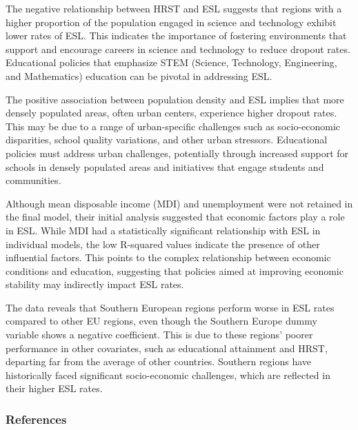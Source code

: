 \documentclass[
  letterpaper,
  DIV=11,
  numbers=noendperiod,
  abstract]{scrartcl}
\begin{document}
The negative relationship between HRST and ESL suggests that regions
with a higher proportion of the population engaged in science and
technology exhibit lower rates of ESL. This indicates the importance of
fostering environments that support and encourage careers in science and
technology to reduce dropout rates. Educational policies that emphasize
STEM (Science, Technology, Engineering, and Mathematics) education can
be pivotal in addressing ESL.

The positive association between population density and ESL implies that
more densely populated areas, often urban centers, experience higher
dropout rates. This may be due to a range of urban-specific challenges
such as socio-economic disparities, school quality variations, and other
urban stressors. Educational policies must address urban challenges,
potentially through increased support for schools in densely populated
areas and initiatives that engage students and communities.

Although mean disposable income (MDI) and unemployment were not retained
in the final model, their initial analysis suggested that economic
factors play a role in ESL. While MDI had a statistically significant
relationship with ESL in individual models, the low R-squared values
indicate the presence of other influential factors. This points to the
complex relationship between economic conditions and education,
suggesting that policies aimed at improving economic stability may
indirectly impact ESL rates.

The data reveals that Southern European regions perform worse in ESL
rates compared to other EU regions, even though the Southern Europe
dummy variable shows a negative coefficient. This is due to these
regions' poorer performance in other covariates, such as educational
attainment and HRST, departing far from the average of other countries.
Southern regions have historically faced significant socio-economic
challenges, which are reflected in their higher ESL rates.

\subsubsection*{References}\label{references}
\end{document}
